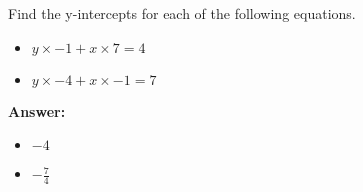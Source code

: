  Find the y-intercepts for each of the following equations. \begin{itemize}\item \( y \times -1 + x \times 7 = 4 \)\item \( y \times -4 + x \times -1 = 7 \)\end{itemize}

        \textbf{Answer:} \begin{itemize}\item \( -4 \)\item \( -\frac{7}{4} \)\end{itemize}
